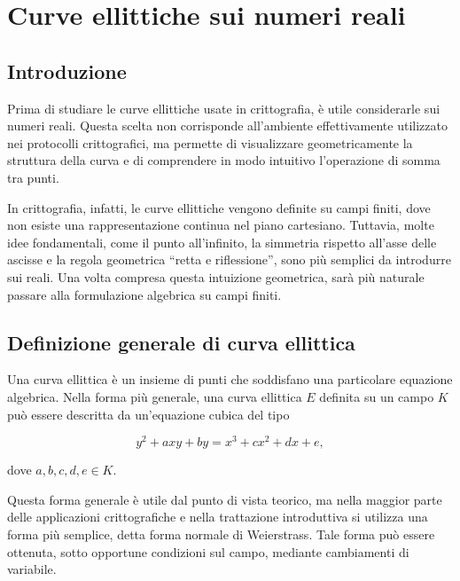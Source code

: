 \documentclass[12pt,a4paper,oneside]{report}
\begin{document}
\chapter{Curve ellittiche sui numeri reali}

\section{Introduzione}

Prima di studiare le curve ellittiche usate in crittografia, è utile considerarle sui numeri reali. Questa scelta non corrisponde all'ambiente effettivamente utilizzato nei protocolli crittografici, ma permette di visualizzare geometricamente la struttura della curva e di comprendere in modo intuitivo l'operazione di somma tra punti.

In crittografia, infatti, le curve ellittiche vengono definite su campi finiti, dove non esiste una rappresentazione continua nel piano cartesiano. Tuttavia, molte idee fondamentali, come il punto all'infinito, la simmetria rispetto all'asse delle ascisse e la regola geometrica ``retta e riflessione'', sono più semplici da introdurre sui reali. Una volta compresa questa intuizione geometrica, sarà più naturale passare alla formulazione algebrica su campi finiti.

\section{Definizione generale di curva ellittica}

Una curva ellittica è un insieme di punti che soddisfano una particolare equazione algebrica. Nella forma più generale, una curva ellittica \(E\) definita su un campo \(K\) può essere descritta da un'equazione cubica del tipo

\begin{equation}
    y^2 + axy + by = x^3 + cx^2 + dx + e,
\end{equation}

dove \(a,b,c,d,e \in K\).

Questa forma generale è utile dal punto di vista teorico, ma nella maggior parte delle applicazioni crittografiche e nella trattazione introduttiva si utilizza una forma più semplice, detta forma normale di Weierstrass. Tale forma può essere ottenuta, sotto opportune condizioni sul campo, mediante cambiamenti di variabile.
\end{document}
